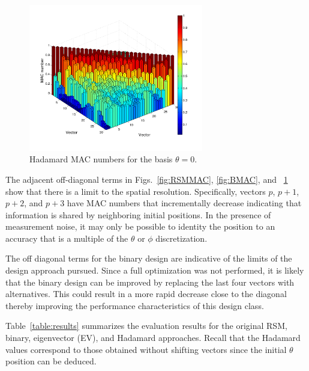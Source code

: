\documentclass[3p,times]{elsarticle}
\begin{document}
\begin{figure}[ht!]
\includegraphics[width={3.0in}]{../figs/HadMAC.pdf}
\centering
\caption{Hadamard MAC numbers for the basis $\theta=0$.}
\label{fig:HadMAC}
\end{figure}

The adjacent off-diagonal terms in Figs.~\ref{fig:RSMMAC}, \ref{fig:BMAC}, and ~\ref{fig:HadMAC} show that there is a limit to the spatial resolution.  
Specifically, vectors $p$, $p+1$, $p+2$, and $p+3$ have MAC numbers that incrementally decrease indicating that information is shared by neighboring initial positions.  
In the presence of measurement noise, it may only be possible to identity the position to an accuracy that is a multiple of the $\theta$ or $\phi$ discretization.

The off diagonal terms for the binary design are indicative of the limits of the design approach pursued.  
Since a full optimization was not performed, it is likely that the binary design can be improved by replacing the last four vectors with alternatives. 
This could result in a more rapid decrease close to the diagonal thereby improving the performance characteristics of this design class.

Table~\ref{table:results} summarizes the evaluation results for the original RSM, binary, eigenvector (EV), and Hadamard approaches.  
Recall that the Hadamard values correspond to those obtained without shifting vectors since the initial $\theta$ position can be deduced.
\end{document}
